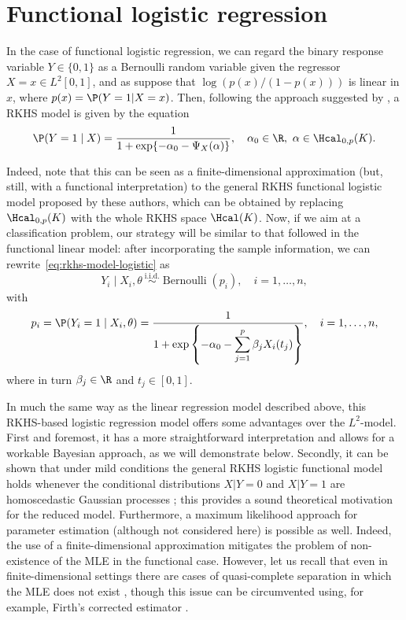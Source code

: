\section{Functional logistic regression}\label{sec:rkhs-logistic-model}

In the case of functional logistic regression, we can regard the binary response variable \(Y\in\{0, 1\}\) as a Bernoulli random variable given the regressor \(X=x \in L^2[0, 1]\), and as suppose that \(\log\left(p(x)/(1-p(x))\right)\) is linear in \(x\), where \(p(x)=\P(Y=1| X=x)\). Then, following the approach  suggested by \citet{berrendero2018functional}, a RKHS model is given  by the  equation
\begin{equation}\label{eq:rkhs-model-logistic}
  \P(Y=1 \mid X) = \frac{1}{1 + \exp\{-\alpha_0 - \Psi_X(\alpha)\}}, \quad \alpha_0 \in \R, \ \alpha \in \Hcal_{0,p}(K).
\end{equation}

Indeed, note that this can be seen as a finite-dimensional approximation (but, still, with a functional interpretation) to the general RKHS functional logistic model proposed by these authors, which can be obtained by replacing \(\Hcal_{0,p}(K)\) with the whole RKHS space \(\Hcal(K)\). Now, if we aim at a classification problem, our strategy will be similar to that followed in the functional linear model: after incorporating the sample information, we can rewrite~\eqref{eq:rkhs-model-logistic} as
\begin{equation}\label{eq:rkhs-model-logistic-2}
Y_i \mid X_i,\theta \ \stackrel{\text{i.i.d.}}{\sim} \operatorname{Bernoulli}(p_i), \quad i=1,\dots, n,
\end{equation}
with
\begin{equation}\label{eq:rkhs-model-logistic-2-parameter}
  p_i = \P(Y_i=1 \mid X_i,\theta) = \frac{1}{\displaystyle 1 + \exp\left\{-\alpha_0 - \sum_{j=1}^p \beta_j X_i(t_j)\right\}}, \quad i=1,\dots, n,
\end{equation}
where in turn \(\beta_j\in\R\) and \(t_j\in[0, 1]\).

In much the same way as the linear regression model described above, this RKHS-based logistic regression model offers some advantages over the \(L^2\)-model. First and foremost, it has a more straightforward interpretation and allows for a workable Bayesian approach, as we will demonstrate below. Secondly, it can be shown that under mild conditions the general RKHS logistic functional model holds whenever the conditional distributions \(X | Y=0\) and \(X|Y=1\) are homoscedastic Gaussian processes \citep[see Theorem 1 in][]{berrendero2018functional}; this provides a sound theoretical motivation for the reduced model. Furthermore, a maximum likelihood approach for parameter estimation (although not considered here) is possible as well. Indeed, the use of a finite-dimensional approximation  mitigates the problem of non-existence of the MLE in the functional case. However, let us recall that even in finite-dimensional settings there are cases of quasi-complete separation in which the MLE does not exist \citep{albert1984existence}, though this issue can be circumvented using, for example, Firth's corrected estimator \citep{firth1993bias}.

